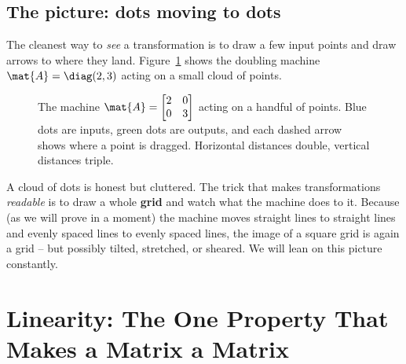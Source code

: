 \subsection{The picture: dots moving to dots}

The cleanest way to \emph{see} a transformation is to draw a few input points and
draw arrows to where they land. Figure~\ref{ch05:fig-action} shows the doubling
machine $\mat{A} = \diag(2,3)$ acting on a small cloud of points.

\begin{figure}[H]
\centering
{}
\caption{The machine $\mat{A}=\protect\begin{bmatrix}2&0\\0&3\protect\end{bmatrix}$
acting on a handful of points. Blue dots are inputs, green dots are outputs, and
each dashed arrow shows where a point is dragged. Horizontal distances double,
vertical distances triple.}
\label{ch05:fig-action}
\end{figure}

A cloud of dots is honest but cluttered. The trick that makes transformations
\emph{readable} is to draw a whole \textbf{grid} and watch what the machine does
to it. Because (as we will prove in a moment) the machine moves straight lines to
straight lines and evenly spaced lines to evenly spaced lines, the image of a
square grid is again a grid -- but possibly tilted, stretched, or sheared. We
will lean on this picture constantly.

\section{Linearity: The One Property That Makes a Matrix a Matrix}
\label{ch05:linearity}

